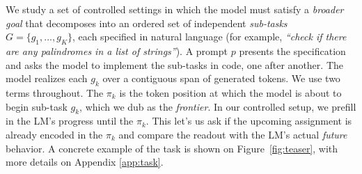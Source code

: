 We study a set of controlled settings in which the model must satisfy a \emph{broader goal} that decomposes into an ordered set of independent \emph{sub-tasks} $G = \{g_1, \dots, g_K\}$, each specified in natural language (for example, \textit{``check if there are any palindromes in a list of strings''}). A prompt $p$ presents the specification and asks the model to implement the sub-tasks in code, one after another. The model realizes each $g_k$ over a contiguous span of generated tokens. We use two terms throughout. The \pivot $\pi_k$ is the token position at which the model is about to begin sub-task $g_k$, which we dub as the \emph{frontier}. In our controlled setup, we prefill in the LM's progress until the \pivot $\pi_k$. This let's us ask if the upcoming assignment is already encoded in the \pivot $\pi_k$ and compare the readout with the LM's actual \emph{future} behavior.  A concrete example of the task is shown on {\color{red} Figure~\ref{fig:teaser}}, with more details on Appendix \ref{app:task}.



